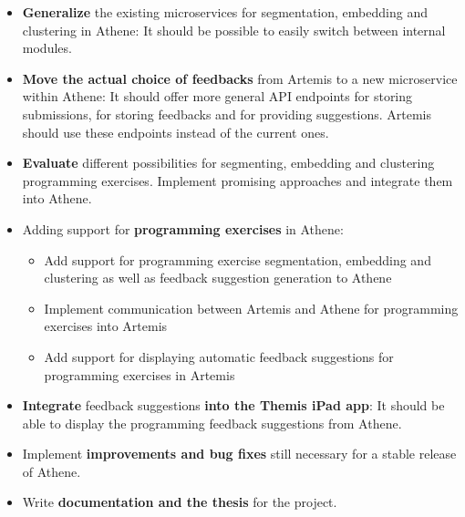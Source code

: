 \begin{itemize}
    \item \textbf{Generalize} the existing microservices for segmentation, embedding and clustering in Athene: It should be possible to easily switch between internal modules.
    \item \textbf{Move the actual choice of feedbacks} from Artemis to a new microservice within Athene: It should offer more general API endpoints for storing submissions, for storing feedbacks and for providing suggestions. Artemis should use these endpoints instead of the current ones.
    \item \textbf{Evaluate} different possibilities for segmenting, embedding and clustering programming exercises. Implement promising approaches and integrate them into Athene. %
    \item Adding support for \textbf{programming exercises} in Athene:
    \begin{itemize}
        \item Add support for programming exercise segmentation, embedding and clustering as well as feedback suggestion generation to Athene
        \item Implement communication between Artemis and Athene for programming exercises into Artemis
        \item Add support for displaying automatic feedback suggestions for programming exercises in Artemis
    \end{itemize}
    \item \textbf{Integrate} feedback suggestions \textbf{into the Themis iPad app}: It should be able to display the programming feedback suggestions from Athene.
    \item Implement \textbf{improvements and bug fixes} still necessary for a stable release of Athene.
    \item Write \textbf{documentation and the thesis} for the project.
\end{itemize}


\clearpage

\clearpage





